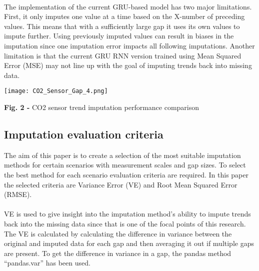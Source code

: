 \documentclass[9.5pt,article,twocolumn]{article}
\begin{document}
\\
The implementation of the current GRU-based model has two major limitations. First, it only imputes one value at a time based on the X-number of preceding values. This means that with a sufficiently large gap it uses its own values to impute further. Using previously imputed values can result in biases in the imputation since one imputation error impacts all following imputations. Another limitation is that the current GRU RNN version trained using Mean Squared Error (MSE) may not line up with the goal of imputing trends back into missing data.

\begin{figure*}[b]
    \texttt{[image: CO2\_Sensor\_Gap\_4.png]}
    \label{fig:my_label}
    \begin{flushleft}
    \begingroup
        \fontsize{9pt}{9pt}\selectfont
        \textbf{Fig. 2 -} CO2 sensor trend imputation performance comparison
    \endgroup
    \vspace{-0.2cm}
    \end{flushleft}    
\end{figure*}
\vspace{0.5cm}
\subsection{Imputation evaluation criteria}
The aim of this paper is to create a selection of the most suitable imputation methods for certain scenarios with measurement scales and gap sizes. To select the best method for each scenario evaluation criteria are required. In this paper the selected criteria are Variance Error (VE) and Root Mean Squared Error (RMSE). 
\\
\\
VE is used to give insight into the imputation method’s ability to impute trends back into the missing data since that is one of the focal points of this research. The VE is calculated by calculating the difference in variance between the original and imputed data for each gap and then averaging it out if multiple gaps are present. To get the difference in variance in a gap, the pandas method “pandas.var” has been used. 
\\
\\
\end{document}

